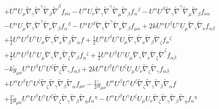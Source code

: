 \documentclass[10pt,letterpaper]{article}
\numberwithin{equation}{section}
\begin{document}
\begin{eqnarray}
&& + U^{\alpha } U_{\mu } \tilde{\nabla}_{\gamma }\tilde{\nabla}^{\gamma }\tilde{\nabla}_{\beta }\tilde{\nabla}^{\beta }f_{\nu \alpha } -  U^{\alpha } U_{\nu } \tilde{\nabla}_{\gamma }\tilde{\nabla}^{\gamma }\tilde{\nabla}_{\mu }\tilde{\nabla}_{\beta }f_{\alpha }{}^{\beta } -  U^{\alpha } U^{\beta } \tilde{\nabla}_{\gamma }\tilde{\nabla}^{\gamma }\tilde{\nabla}_{\mu }\tilde{\nabla}_{\beta }f_{\nu \alpha } \nonumber \\ 
&& -  U^{\alpha } U_{\mu } \tilde{\nabla}_{\gamma }\tilde{\nabla}^{\gamma }\tilde{\nabla}_{\nu }\tilde{\nabla}_{\beta }f_{\alpha }{}^{\beta } -  U^{\alpha } U^{\beta } \tilde{\nabla}_{\gamma }\tilde{\nabla}^{\gamma }\tilde{\nabla}_{\nu }\tilde{\nabla}_{\beta }f_{\mu \alpha } + 2 k U^{\alpha } U^{\beta } U^{\gamma } U_{\mu } \tilde{\nabla}_{\gamma }\tilde{\nabla}_{\nu }f_{\alpha \beta } \nonumber \\ 
&& + \tfrac{1}{2} U^{\alpha } U^{\beta } U^{\gamma } U_{\mu } \tilde{\nabla}_{\gamma }\tilde{\nabla}_{\nu }\tilde{\nabla}_{\beta }\tilde{\nabla}_{\alpha }f + \tfrac{1}{2} U^{\alpha } U^{\beta } U^{\gamma } U_{\mu } \tilde{\nabla}_{\gamma }\tilde{\nabla}_{\nu }\tilde{\nabla}_{\beta }\tilde{\nabla}_{\zeta }f_{\alpha }{}^{\zeta } \nonumber \\ 
&& + \tfrac{1}{2} U^{\alpha } U^{\beta } U^{\gamma } U_{\mu } \tilde{\nabla}_{\gamma }\tilde{\nabla}_{\nu }\tilde{\nabla}_{\zeta }\tilde{\nabla}_{\beta }f_{\alpha }{}^{\zeta } + \tfrac{1}{2} U^{\alpha } U^{\beta } U^{\gamma } U_{\mu } \tilde{\nabla}_{\gamma }\tilde{\nabla}_{\nu }\tilde{\nabla}_{\zeta }\tilde{\nabla}^{\zeta }f_{\alpha \beta } \nonumber \\ 
&& -  k \tilde{g}_{\mu \nu } U^{\alpha } U^{\beta } U^{\gamma } U^{\zeta } \tilde{\nabla}_{\zeta }\tilde{\nabla}_{\gamma }f_{\alpha \beta } + 2 k U^{\alpha } U^{\beta } U^{\gamma } U^{\zeta } U_{\mu } U_{\nu } \tilde{\nabla}_{\zeta }\tilde{\nabla}_{\gamma }f_{\alpha \beta } \nonumber \\ 
&& + U^{\alpha } U^{\beta } U^{\gamma } U^{\zeta } \tilde{\nabla}_{\zeta }\tilde{\nabla}_{\gamma }\tilde{\nabla}_{\beta }\tilde{\nabla}_{\alpha }f_{\mu \nu } -  \tfrac{1}{2} \tilde{g}_{\mu \nu } U^{\alpha } U^{\beta } U^{\gamma } U^{\zeta } \tilde{\nabla}_{\zeta }\tilde{\nabla}_{\gamma }\tilde{\nabla}_{\beta }\tilde{\nabla}_{\alpha }f \nonumber \\ 
&& + \tfrac{1}{2} \tilde{g}_{\mu \nu } U^{\alpha } U^{\beta } U^{\gamma } U^{\zeta } \tilde{\nabla}_{\zeta }\tilde{\nabla}_{\gamma }\tilde{\nabla}_{\beta }\tilde{\nabla}_{\eta }f_{\alpha }{}^{\eta } -  U^{\alpha } U^{\beta } U^{\gamma } U^{\zeta } U_{\mu } U_{\nu } \tilde{\nabla}_{\zeta }\tilde{\nabla}_{\gamma }\tilde{\nabla}_{\beta }\tilde{\nabla}_{\eta }f_{\alpha }{}^{\eta } \nonumber \\ 

\end{eqnarray}
\end{document}
